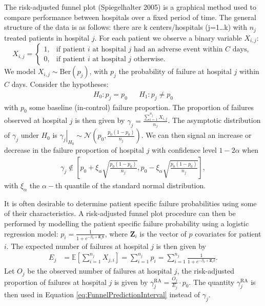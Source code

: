 The risk-adjusted funnel plot (Spiegelhalter 2005) is a graphical method used to compare performance between hospitals over a fixed period of time.
The general structure of the data is as follows: there are k centers/hospitals (j=1\ldots k) with \(n_j\) treated patients in hospital \(j\). For each patient we observe a binary variable \(X_{i,j}\):
\begin{equation}
X_{i,j} = \begin{cases}
1, & \text{if patient } i \text{ at hospital } j \text{ had an adverse event within $C$ days, } \\
0, & \text{if patient } i \text{ at hospital } j \text{ otherwise.}
\end{cases}
\label{eq:DiscreteOutcome}
\end{equation}
We model \(X_{i,j} \sim \mathrm{Ber}(p_j)\), with \(p_j\) the probability of failure at hospital \(j\) within \(C\) days.
Consider the hypotheses:
\begin{align}
H_0: p_j = p_0 && H_1: p_j \neq p_0
\label{eq:FunnelHypotheses}
\end{align}
with \(p_0\) some baseline (in-control) failure proportion. The proportion of failures observed at hospital \(j\) is then given by \(\gamma_j = \frac{\sum_{i=1}^{n_j}X_{i,j}}{n_j }\). The asymptotic distribution of \(\gamma_j\) under \(H_0\) is \(\left. \gamma_j \right|_{H_0} \sim \mathcal{N}\left( p_0, \frac{p_0(1-p_0)}{n_j} \right)\). We can then signal an increase or decrease in the failure proportion of hospital \(j\) with confidence level \(1-2\alpha\) when
\begin{align}
\gamma_j \notin \left[  p_0 + \xi_{\alpha} \sqrt{\frac{p_0(1-p_0)}{n_j}}, p_0 - \xi_{\alpha} \sqrt{\frac{p_0(1-p_0)}{n_j}}  \right],
\label{eq:FunnelPredictionInterval}
\end{align}
with \(\xi_{\alpha}\) the \(\alpha-\)th quantile of the standard normal distribution.

It is often desirable to determine patient specific failure probabilities using some of their characteristics. A risk-adjusted funnel plot procedure can then be performed by modelling the patient specific failure probability using a logistic regression model: \(p_i = \frac{1}{1 + e^{-\beta_0 + \pmb{Z}_i \pmb{\beta}}}\), where \(\pmb{Z}_i\) is the vector of \(p\) covariates for patient \(i\). The expected number of failures at hospital \(j\) is then given by
\begin{align}
E_j &= \mathbb{E} \left[ \sum_{i=1}^{n_j} X_{j,i} \right] =  \sum_{i=1}^{n_j} p_i =  \sum_{i=1}^{n_j} \frac{1}{1 + e^{-\beta_0 + \pmb{Z}_i \beta}}.
\label{eq:RAExpectedDeaths}
\end{align}
Let \(O_j\) be the observed number of failures at hospital \(j\), the risk-adjusted proportion of failures at hospital \(j\) is given by \(\gamma_{j}^{\mathrm{RA}} = \frac{O_j}{E_j} \cdot p_0\). The quantity \(\gamma_{j}^{\mathrm{RA}}\) is then used in Equation \eqref{eq:FunnelPredictionInterval} instead of \(\gamma_j\).

